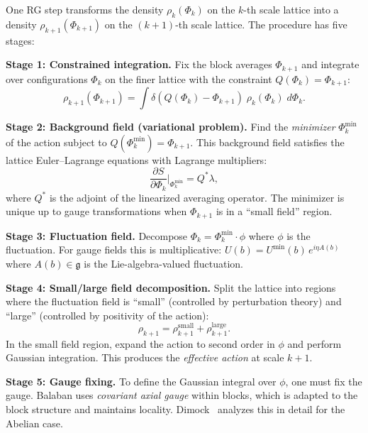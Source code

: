 \documentclass[11pt,a4paper]{article}
\theoremstyle{plain}
\theoremstyle{definition}
\theoremstyle{remark}
\newcommand{\fg}{\mathfrak{g}}
\begin{document}
One RG step transforms the density
$\rho_k(\Phi_k)$ on the $k$-th scale lattice into a density
$\rho_{k+1}(\Phi_{k+1})$ on the $(k+1)$-th scale lattice.
The procedure has five stages:

\medskip\noindent
\textbf{Stage 1: Constrained integration.}
Fix the block averages $\Phi_{k+1}$ and integrate
over configurations $\Phi_k$ on the finer lattice
with the constraint $Q(\Phi_k) = \Phi_{k+1}$:
\begin{equation}\label{eq:constrained}
  \rho_{k+1}(\Phi_{k+1}) = \int
  \delta(Q(\Phi_k) - \Phi_{k+1})\;
  \rho_k(\Phi_k)\; d\Phi_k.
\end{equation}

\noindent
\textbf{Stage 2: Background field (variational problem).}
Find the \emph{minimizer} $\Phi_k^{\min}$ of the action
subject to $Q(\Phi_k^{\min}) = \Phi_{k+1}$.
This background field satisfies the lattice
Euler--Lagrange equations with Lagrange multipliers:
\begin{equation}\label{eq:variational}
  \frac{\partial S}{\partial \Phi_k}
  \bigg|_{\Phi_k^{\min}} =
  Q^* \lambda,
\end{equation}
where $Q^*$ is the adjoint of the linearized averaging
operator. The minimizer is unique up to gauge transformations
when $\Phi_{k+1}$ is in a ``small field'' region.

\medskip\noindent
\textbf{Stage 3: Fluctuation field.}
Decompose $\Phi_k = \Phi_k^{\min} \cdot \phi$
where $\phi$ is the fluctuation. For gauge fields
this is multiplicative: $U(b) = U^{\min}(b)\, e^{i\eta A(b)}$
where $A(b) \in \fg$ is the Lie-algebra-valued fluctuation.

\medskip\noindent
\textbf{Stage 4: Small/large field decomposition.}
Split the lattice into regions where the fluctuation
field is ``small'' (controlled by perturbation theory)
and ``large'' (controlled by positivity of the action):
\begin{equation}
  \rho_{k+1} = \rho_{k+1}^{\text{small}} +
  \rho_{k+1}^{\text{large}}.
\end{equation}
In the small field region, expand the action to
second order in $\phi$ and perform Gaussian integration.
This produces the \emph{effective action} at scale $k+1$.

\medskip\noindent
\textbf{Stage 5: Gauge fixing.}
To define the Gaussian integral over $\phi$, one must
fix the gauge. Balaban uses \emph{covariant axial gauge}
within blocks, which is adapted to the block structure
and maintains locality. Dimock~\cite{Dimock15a} analyzes
this in detail for the Abelian case.
\end{document}
